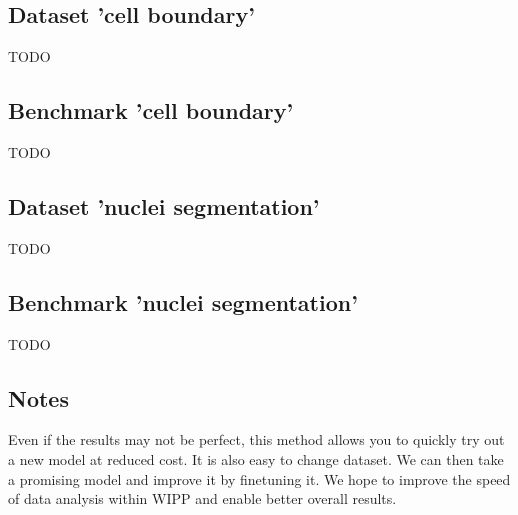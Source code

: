 \subsection{Dataset 'cell boundary'}

TODO

\subsection{Benchmark 'cell boundary'}

TODO

\subsection{Dataset 'nuclei segmentation'}

TODO

\subsection{Benchmark 'nuclei segmentation'}


TODO

\subsection{Notes}

Even if the results may not be perfect, this method allows you to quickly try
out a new model at reduced cost. It is also easy to change dataset. We can then
take a promising model and improve it by finetuning it. We hope to improve the
speed of data analysis within \Gls{WIPP} and enable better overall results.
